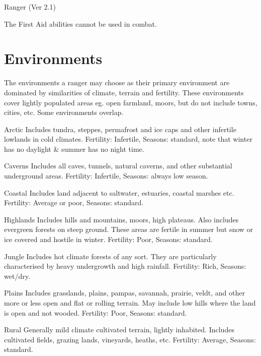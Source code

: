 \begin{Chapter}{Ranger (Ver 2.1)}
\begin{Description}
The First Aid abilities cannot be used in combat.

\end{Description}

\section{Environments}

The environments a ranger may choose as their primary environment are
dominated by similarities of climate, terrain and fertility. These
environments cover lightly populated areas eg.  open farmland, moors,
but do not include towns, cities, etc.  Some environments overlap.

\begin{Description}

\item[Arctic] Includes tundra, steppes, permafrost and ice caps and
  other infertile lowlands in cold climates.  Fertility: Infertile,
  Seasons: standard, note that winter has no daylight \& summer has no
  night time.

\item[Caverns] Includes all caves, tunnels, natural caverns, and other
  substantial underground areas.  Fertility: Infertile, Seasons:
  always low season.

\item[Coastal] Includes land adjacent to saltwater, estuaries, coastal
  marshes etc. Fertility: Average or poor, Seasons: standard.

\item[Highlands] Includes hills and mountains, moors, high plateaus.
  Also includes evergreen forests on steep ground. These areas are
  fertile in summer but snow or ice covered and hostile in
  winter. Fertility: Poor, Seasons: standard.

\item[Jungle] Includes hot climate forests of any sort.  They are
  particularly characterised by heavy undergrowth and high rainfall.
  Fertility: Rich, Seasons: wet/dry.

\item[Plains] Includes grasslands, plains, pampas, savannah, prairie,
  veldt, and other more or less open and flat or rolling terrain. May
  include low hills where the land is open and not wooded.  Fertility:
  Poor, Seasons: standard.

\item[Rural] Generally mild climate cultivated terrain, lightly
  inhabited. Includes cultivated fields, grazing lands, vineyards,
  heaths, etc.  Fertility: Average, Seasons: standard.


\end{Description}
\end{Chapter}
